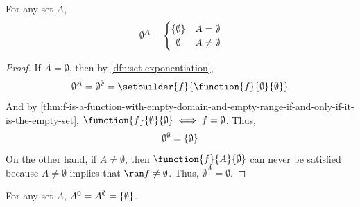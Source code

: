 \begin{thm}
    \label{thm:the-exponentiation-of-the-empty-set}
    For any set \( A \),
    \begin{equation*}
        \emptyset^{A} =
        \begin{cases}
            \mleft\{ \emptyset \mright\}  & A = \emptyset \\
            \,\,\,\emptyset               & A \neq \emptyset
        \end{cases}
    \end{equation*}
\end{thm}

\begin{proof}
    If \( A = \emptyset \), then by \cref{dfn:set-exponentiation},
    \begin{equation*}
        \emptyset^{A} = \emptyset^\emptyset = \setbuilder{f}{\function{f}{\emptyset}{\emptyset}}
    \end{equation*}
    And by \cref{thm:f-is-a-function-with-empty-domain-and-empty-range-if-and-only-if-it-is-the-empty-set},
    \( \function{f}{\emptyset}{\emptyset} \iff f = \emptyset \). Thus,
    \begin{equation*}
        \emptyset^{\emptyset} = \mleft\{ \emptyset \mright\}
    \end{equation*}
    On the other hand, if \( A \neq \emptyset \), then \( \function{f}{A}{\emptyset} \) can never be satisfied
    because \( A \neq \emptyset \) implies that \( \ran f \neq \emptyset \). Thus, \( \emptyset^{A} = \emptyset \).
\end{proof}

\begin{thm}
     \label{thm:set-exponentiation-with-empty-exponent}
    For any set \( A \), \( A^{0} = A^{\emptyset} = \mleft\{ \emptyset \mright\} \).
\end{thm}

